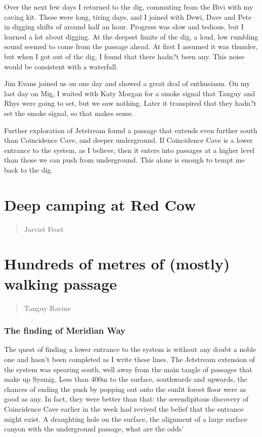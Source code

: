 \documentclass[onecolumn]{book}
\begin{document}
Over the next few days I returned to the dig, commuting from the Bivi with my caving kit. These were long, tiring days, and I joined with Dewi, Dave and Pete in digging shifts of around half an hour. Progress was slow and tedious, but I learned a lot about digging. At the deepest limits of the dig, a loud, low rumbling sound seemed to come from the passage ahead. At first I assumed it was thunder, but when I got out of the dig, I found that there hadn?t been any. This noise would be consistent with a waterfall.

Jim Evans joined us on one day and showed a great deal of enthusiasm. On my last day on Mig, I waited with Katy Morgan for a smoke signal that Tanguy and Rhys were going to set, but we saw nothing. Later it transpired that they hadn?t set the smoke signal, so that makes sense.

Further exploration of Jetstream found a passage that extends even further south than Coincidence Cave, and deeper underground. If Coincidence Cave is a lower entrance to the system, as I believe, then it enters into passages at a higher level than those we can push from underground. This alone is enough to tempt me back to the dig.

\section{Deep camping at Red Cow}
 \begin{verse}
Jarvist Frost
\end{verse}

\section{Hundreds of metres of (mostly) walking passage} 
 \begin{verse}
Tanguy Racine
\end{verse}
\subsubsection{The finding of Meridian Way} 

The quest of finding a lower entrance to the system is without any doubt a noble one and hasn't been completed as I write these lines. The Jetstream extension of the system was spearing south, well away from the main tangle of passages that make up Sysmig. Less than 400m to the surface, southwards and upwards, the chances of ending the push by popping out onto the sunlit forest floor were as good as any. In fact, they were better than that: the serendipitous discovery of Coincidence Cave earlier in the week had revived the belief that the entrance might exist. A draughting hole on the surface, the alignment of a large surface canyon with the underground passage, what are the odds' 
\end{document}
